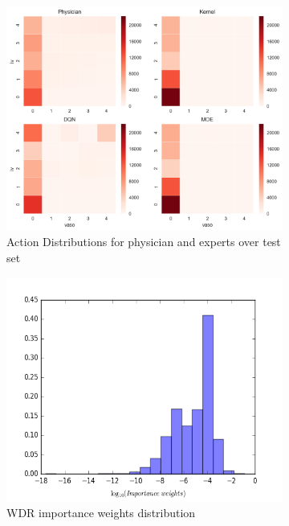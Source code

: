 \documentclass[10pt]{amia}
\begin{document}
\begin{figure}
  \centering
  \begin{subfigure}[b]{0.6\textwidth}
  \centering
  \includegraphics[width=\linewidth]{figures/actions}\hfill
  \caption{\label{fig:expert_actions}Action Distributions for physician and experts over test set}
  \label{fig:twelve:b}
  \end{subfigure}%
  \begin{subfigure}[b]{0.4\textwidth}
  \centering
  \includegraphics[width=\linewidth]{figures/WDR_weights}\hfill
  \caption{\label{fig:WDR_weights}WDR importance weights distribution}
  \label{fig:twelve:a}
  \end{subfigure}%
  \caption{}
  \label{fig:twelve}
\end{figure}
\end{document}
